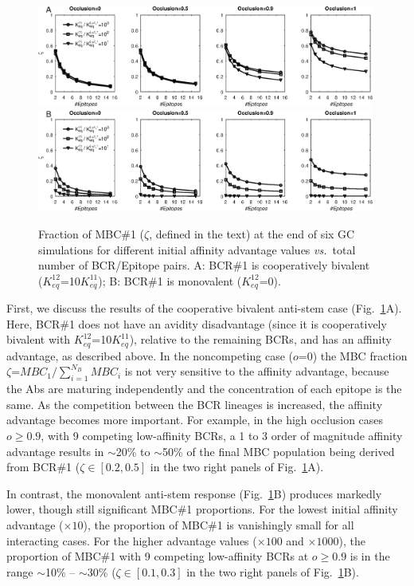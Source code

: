 \documentclass[utf8]{frontiersHLTH}%
\newcommand{\vo}[1]{#1} %
\def\vs {{\it vs.}}
\newcommand{\fig}[1]{Fig.~\ref{fig:#1}}
\newcommand{\occl}{o}
\newcommand{\hfig}[1]{#1} %
\begin{document}
\hfig{
\begin{figure}
\centering
\includegraphics[width=0.99\textwidth]{../fig6/occl-k12=10agc1=1.eps}
\includegraphics[width=0.99\textwidth]{../fig6/occl-k12=0agc1=1.eps}
\caption{Fraction of MBC\#1 ($\zeta$, \vo{defined in the text}) at the end of six GC simulations for different initial affinity advantage values
 \vs~total number of BCR/Epitope pairs.
A: BCR\#1 is cooperatively bivalent ($K^{12}_{eq}$=10$K^{11}_{eq}$);
B: BCR\#1 is monovalent ($K^{12}_{eq}$=0).
}
\label{fig:kadv2}
\end{figure}
}
First, we discuss the results of the cooperative bivalent anti-stem case (\fig{kadv2}A).
Here, BCR\#1 does not have an avidity disadvantage (since it is cooperatively bivalent with $K^{12}_{eq}$=10$K^{11}_{eq}$),
relative to the
remaining BCRs, and has an affinity advantage, as described above. In the
noncompeting case ($\occl$=0) the MBC fraction
$\zeta$=$MBC_1/\sum_{i=1}^{N_B} MBC_i$ is not very sensitive to the affinity
advantage, because the Abs are maturing independently and the
concentration of each epitope is the same. As the competition between
the BCR lineages is increased, the affinity advantage becomes more
important. For example, in the high occlusion cases $\occl\ge 0.9$, with 9
competing low-affinity BCRs, a 1 to 3 order of magnitude affinity advantage results
in $\sim$20\% to $\sim$50\% of the final MBC population being derived from BCR\#1
\vo{($\zeta\in[0.2,0.5]$ in the two right panels of \fig{kadv2}A).}

In contrast, the monovalent anti-stem response (\fig{kadv2}B) produces
markedly lower, though still significant MBC\#1 proportions. For the
lowest initial affinity advantage ($\times 10$), the proportion of MBC\#1 is
vanishingly small for all interacting cases. For the higher advantage values
($\times 100$ and $\times 1000$), the proportion of MBC\#1 with 9 competing low-affinity
BCRs at $\occl\ge 0.9$ is in the range $\sim$10\% -- $\sim$30\%
\vo{($\zeta\in[0.1,0.3]$ in the two right panels of \fig{kadv2}B).}
\end{document}
